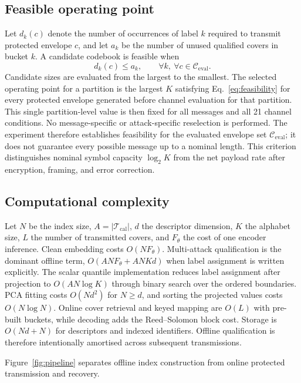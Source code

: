 ﻿\documentclass[a4paper,fleqn]{cas-dc}
\begin{document}
\subsection{Feasible operating point}

Let $d_k(c)$ denote the number of occurrences of label $k$ required to
transmit protected envelope $c$, and let $a_k$ be the number of unused
qualified covers in bucket $k$. A candidate codebook is feasible when
\begin{equation}
d_k(c)\leq a_k,\qquad
\forall k,\ \forall c\in\mathcal{C}_{\mathrm{eval}}.
\label{eq:feasibility}
\end{equation}
Candidate sizes are evaluated from the largest to the smallest. The selected
operating point for a partition is the largest $K$ satisfying
Eq.~\eqref{eq:feasibility} for every protected envelope generated before
channel evaluation for that partition. This single partition-level value is
then fixed for all messages and all 21 channel conditions. No message-specific
or attack-specific reselection is performed. The experiment therefore
establishes feasibility for the evaluated envelope set
$\mathcal{C}_{\mathrm{eval}}$; it does not guarantee every possible message
up to a nominal length. This criterion distinguishes nominal symbol capacity
$\log_2K$ from the net payload rate after encryption, framing, and error
correction.

\subsection{Computational complexity}

Let $N$ be the index size, $A=|\mathcal{T}_{\mathrm{cal}}|$, $d$ the
descriptor dimension, $K$ the alphabet size, $L$ the number of transmitted
covers, and $F_\theta$ the cost of one encoder inference. Clean embedding
costs $O(NF_\theta)$. Multi-attack qualification is the dominant offline term,
$O(ANF_\theta+ANKd)$ when label assignment is written explicitly. The scalar
quantile implementation reduces label assignment after projection to
$O(AN\log K)$ through binary search over the ordered boundaries.
PCA fitting costs $O(Nd^2)$ for $N\ge d$, and sorting the projected values
costs $O(N\log N)$. Online cover retrieval and keyed mapping are $O(L)$ with
pre-built buckets, while decoding adds the Reed--Solomon block cost. Storage
is $O(Nd+N)$ for descriptors and indexed identifiers. Offline qualification
is therefore intentionally amortised across subsequent transmissions.

Figure~\ref{fig:pipeline} separates offline index construction from online
protected transmission and recovery.
\end{document}
